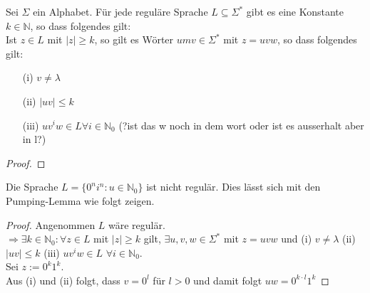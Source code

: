  Sei $\Sigma$ ein Alphabet. Für jede reguläre Sprache $L \subseteq \Sigma^*$ gibt es eine Konstante $k \in \mathbb{N}$, so dass folgendes gilt:\\ Ist $z \in L$ mit $|z| \geq k$, so gilt es Wörter $um v \in \Sigma^*$ mit $z = uvw$, so dass folgendes gilt:
\begin{itemize}
  \item [(i)]$v \not = \lambda$
  \item [(ii)]$|uv| \leq k$
  \item [(iii)]$uv^iw \in L \forall i \in \mathbb{N}_0$ (?ist das w noch in dem wort oder ist es ausserhalt aber in l?)
\end{itemize} 
\begin{proof}
\end{proof}

   Die Sprache $L = \{0^n i^n : u \in \mathbb{N}_0\}$ ist nicht regulär. Dies lässt sich mit den Pumping-Lemma wie folgt zeigen.

  \begin{proof}
    Angenommen $L$ wäre regulär.\\
    $\Rightarrow \exists k \in \mathbb{N}_0 : \forall z \in L$ mit $|z| \geq k$ gilt, $\exists u, v, w \in \Sigma^*$ mit $z = uvw$ und (i) $v \not = \lambda$ (ii) $|uv| \leq k$ (iii) $uv^i w \in L$ $\forall i \in \mathbb{N}_0$. \\ Sei $z:= 0^k 1^k$. \\Aus (i) und (ii) folgt, dass $v = 0^l$ für $l > 0$ und damit folgt $uw = 0^{k\cdot l} 1^k$
  \end{proof}
  
